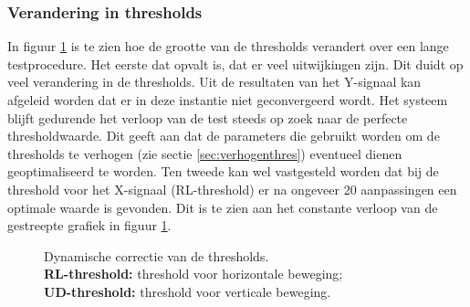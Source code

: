 \documentclass{article}
\newcommand{\figwidth}{0.75\linewidth}
\begin{document}
\subsubsection*{Verandering in thresholds}
In figuur \ref{fig:resthresholds} is te zien hoe de grootte van de thresholds verandert over een lange testprocedure. Het eerste dat opvalt is, dat er veel uitwijkingen zijn. Dit duidt op veel verandering in de thresholds. Uit de resultaten van het Y-signaal kan afgeleid worden dat er in deze instantie niet geconvergeerd wordt. Het systeem blijft gedurende het verloop van de test steeds op zoek naar de perfecte thresholdwaarde. Dit geeft aan dat de parameters die gebruikt worden om de thresholds te verhogen (zie sectie \ref{sec:verhogenthres})  eventueel dienen geoptimaliseerd te worden. Ten tweede kan wel vastgesteld worden dat bij de threshold voor het X-signaal (RL-threshold) er na ongeveer 20 aanpassingen een optimale waarde is gevonden. Dit is te zien aan het constante verloop van de gestreepte grafiek in figuur \ref{fig:resthresholds}.
\begin{figure}[H]
	\centering
	\caption{Dynamische correctie van de thresholds.\\\textbf{RL-threshold:} threshold voor horizontale beweging;\\\textbf{UD-threshold:} threshold voor verticale beweging.}
	\label{fig:resthresholds}
\end{figure}
\end{document}
